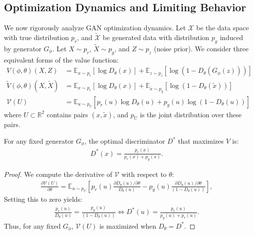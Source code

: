 \subsection{Optimization Dynamics and Limiting Behavior}%
\label{sec:optimization-dynamics}%
We now rigorously analyze GAN optimization dynamics. Let $\mathcal{X}$ be the data space with true distribution $p_r$, and $\tilde{\mathcal{X}}$ be generated data with distribution $p_g$ induced by generator $G_\phi$. Let $X \sim p_r$, $\tilde{X} \sim p_g$, and $Z \sim p_z$ (noise prior).
We consider three equivalent forms of the value function:
\begin{align}
	V(\phi, \theta)(X, Z)                 & = \mathbb{E}_{x \sim p_r}[\log D_\theta(x)] + \mathbb{E}_{z \sim p_z}[\log(1 - D_\theta(G_\phi(z)))]         \\
	\tilde{V}(\phi, \theta)(X, \tilde{X}) & = \mathbb{E}_{x \sim p_r}[\log D_\theta(x)] + \mathbb{E}_{\tilde{x} \sim p_g}[\log(1 - D_\theta(\tilde{x}))] \\
	\mathcal{V}(U)                        & = \mathbb{E}_{u \sim p_U} [p_r(u) \log D_\theta(u) + p_g(u) \log(1 - D_\theta(u))]
\end{align}
where $U \subset \mathbb{R}^2$ contains pairs $(x, \tilde{x})$, and $p_U$ is the joint distribution over these pairs.
\begin{theorem}%
	\label{theorem:minimax}
	For any fixed generator $G_\phi$, the optimal discriminator $D^*$ that maximizes $V$ is:
	\begin{align}
		D^*(x) = \frac{p_r(x)}{p_r(x) + p_g(x)}.
	\end{align}
\end{theorem}
\begin{proof}
	We compute the derivative of $\mathcal{V}$ with respect to $\theta$:
	\begin{align}
		\label{eq:derivatives}
		\frac{\partial \mathcal{V}(U)}{\partial \theta} = \mathbb{E}_{u \sim p_U}\left[ p_r(u) \frac{\partial D_\theta(u) / \partial \theta}{D_\theta(u)} - p_g(u) \frac{\partial D_\theta(u) / \partial \theta}{(1 - D_\theta(u))}\right],
	\end{align}
	Setting this to zero yields:
	\begin{align}
		\label{eq:20}
		\frac{p_r(u)}{D_\theta(u)} = \frac{p_g(u)}{(1 - D_\theta(u))} \iff D^*(u) = \frac{p_r(u)}{p_g(u) + p_r(u)}.
	\end{align}
	Thus, for any fixed $G_\phi$, $\mathcal{V}(U)$ is maximized when $D_\theta = D^*$.
\end{proof}
